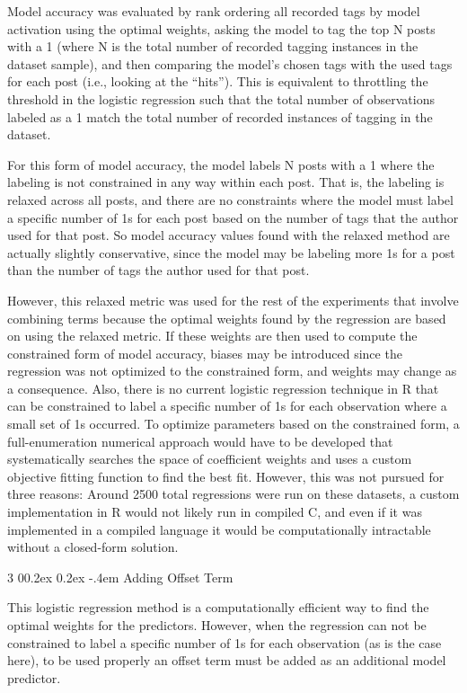 \documentclass[man,floatsintext,donotrepeattitle]{apa6}
\makeatletter
\renewcommand{\subsubsection}{%
  \@startsection
  {subsubsection}%
  {3}%
  {\parindent}%
  {0\baselineskip \@plus 0.2ex \@minus 0.2ex}%
  {-.4em}%
  {\normalfont\normalsize\bfseries\addperi}}
\makeatother
\begin{document}
Model accuracy was evaluated by rank ordering all recorded tags by model activation using the optimal weights,
asking the model to tag the top N posts with a 1 (where N is the total number of recorded tagging instances in the dataset sample),
and then comparing the model's chosen tags with the used tags for each post (i.e., looking at the ``hits'').
This is equivalent to throttling the threshold in the logistic regression such that the total number of observations labeled as a 1 match the total number of recorded instances of tagging in the dataset.

For this form of model accuracy, the model labels N posts with a 1 where the labeling is not constrained in any way within each post.
That is, the labeling is relaxed across all posts, and there are no constraints where the model must label a specific number of 1s for each post based on the number of tags that the author used for that post.
So model accuracy values found with the relaxed method are actually slightly conservative, since the model may be labeling more 1s for a post than the number of tags the author used for that post.

However, this relaxed metric was used for the rest of the experiments that involve combining terms because the optimal weights found by the regression are based on using the relaxed metric.
If these weights are then used to compute the constrained form of model accuracy, biases may be introduced since the regression was not optimized to the constrained form, and weights may change as a consequence.
Also, there is no current logistic regression technique in R that can be constrained to label a specific number of 1s for each observation where a small set of 1s occurred. 
To optimize parameters based on the constrained form,
a full-enumeration numerical approach would have to be developed that systematically searches the space of coefficient weights and uses a custom objective fitting function to find the best fit.
However, this was not pursued for three reasons:
Around \num{2500} total regressions were run on these datasets,
a custom implementation in R would not likely run in compiled C,
and even if it was implemented in a compiled language it would be computationally intractable without a closed-form solution.

\subsubsection{Adding Offset Term}

This logistic regression method is a computationally efficient way to find the optimal weights for the predictors.
However, when the regression can not be constrained to label a specific number of 1s for each observation (as is the case here), to be used properly an offset term must be added as an additional model predictor.
\end{document}
